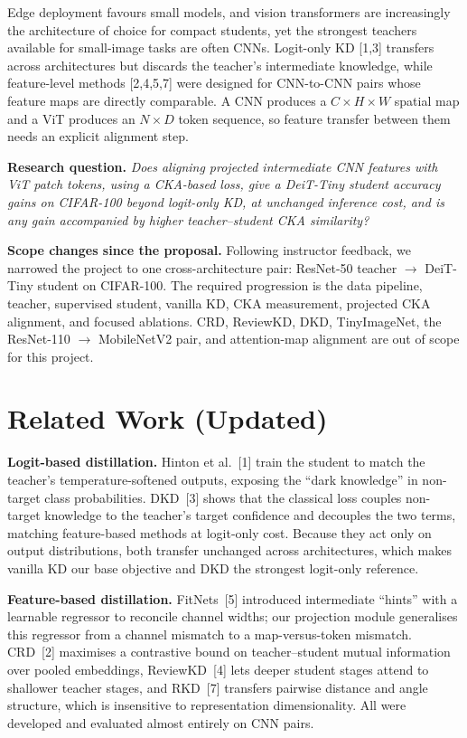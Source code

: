 \documentclass[11pt, letterpaper]{article}
\begin{document}
Edge deployment favours small models, and vision transformers are increasingly
the architecture of choice for compact students, yet the strongest teachers
available for small-image tasks are often CNNs. Logit-only KD [1,3] transfers
across architectures but discards the teacher's intermediate knowledge, while
feature-level methods [2,4,5,7] were designed for CNN-to-CNN pairs whose
feature maps are directly comparable. A CNN produces a $C\times H\times W$
spatial map and a ViT produces an $N\times D$ token sequence, so feature
transfer between them needs an explicit alignment step.

\textbf{Research question.} \emph{Does aligning projected intermediate CNN
features with ViT patch tokens, using a CKA-based loss, give a DeiT-Tiny
student accuracy gains on CIFAR-100 beyond logit-only KD, at unchanged
inference cost, and is any gain accompanied by higher teacher--student CKA
similarity?}

\textbf{Scope changes since the proposal.} Following instructor feedback, we
narrowed the project to one cross-architecture pair: ResNet-50 teacher
$\rightarrow$ DeiT-Tiny student on CIFAR-100. The required progression is the
data pipeline, teacher, supervised student, vanilla KD, CKA measurement,
projected CKA alignment, and focused ablations. CRD, ReviewKD, DKD,
TinyImageNet, the ResNet-110 $\rightarrow$ MobileNetV2 pair, and attention-map
alignment are out of scope for this project.

\section{Related Work (Updated)}

\textbf{Logit-based distillation.} Hinton et al.~[1] train the student to match
the teacher's temperature-softened outputs, exposing the ``dark knowledge'' in
non-target class probabilities. DKD~[3] shows that the classical loss couples
non-target knowledge to the teacher's target confidence and decouples the two
terms, matching feature-based methods at logit-only cost. Because they act only
on output distributions, both transfer unchanged across architectures, which
makes vanilla KD our base objective and DKD the strongest logit-only reference.

\textbf{Feature-based distillation.} FitNets~[5] introduced intermediate
``hints'' with a learnable regressor to reconcile channel widths; our projection
module generalises this regressor from a channel mismatch to a map-versus-token
mismatch. CRD~[2] maximises a contrastive bound on teacher--student mutual
information over pooled embeddings, ReviewKD~[4] lets deeper student stages
attend to shallower teacher stages, and RKD~[7] transfers pairwise distance and
angle structure, which is insensitive to representation dimensionality. All
were developed and evaluated almost entirely on CNN pairs.
\end{document}
